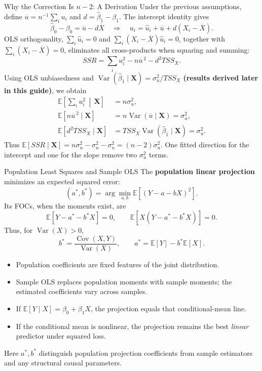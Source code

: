 \documentclass[10pt,aspectratio=169]{beamer}
\newcommand{\E}{\mathbb{E}}
\newcommand{\Var}{\operatorname{Var}}
\newcommand{\Cov}{\operatorname{Cov}}
\begin{document}
\begin{frame}{Why the Correction Is $n-2$: A Derivation}
\small
Under the previous assumptions, define $\overline u=n^{-1}\sum_i u_i$ and
$d=\widehat\beta_1-\beta_1$. The intercept identity gives
\[
\widehat\beta_0-\beta_0=\overline u-d\overline X
\quad\Longrightarrow\quad
u_i=\widehat u_i+\overline u+d(X_i-\overline X).
\]
OLS orthogonality, $\sum_i\widehat u_i=0$ and
$\sum_i(X_i-\overline X)\widehat u_i=0$, together with
$\sum_i(X_i-\overline X)=0$, eliminates all cross-products when squaring and summing:
\[
SSR=\sum_i u_i^2-n\overline u^{\,2}-d^2TSS_X.
\]
Using OLS unbiasedness and $\Var(\widehat\beta_1\mid\mathbf X)=\sigma_u^2/TSS_X$
\textbf{(results derived later in this guide)}, we obtain
\begin{align*}
\E\!\left[\sum_i u_i^2\,\middle|\,\mathbf X\right]&=n\sigma_u^2,\\
\E[n\overline u^{\,2}\mid\mathbf X]&=n\Var(\overline u\mid\mathbf X)=\sigma_u^2,\\
\E[d^2TSS_X\mid\mathbf X]&=TSS_X\Var(\widehat\beta_1\mid\mathbf X)=\sigma_u^2.
\end{align*}
Thus $\E[SSR\mid\mathbf X]=n\sigma_u^2-\sigma_u^2-\sigma_u^2=(n-2)\sigma_u^2$.
One fitted direction for the intercept and one for the slope remove two $\sigma_u^2$ terms.
\end{frame}

\begin{frame}{Population Least Squares and Sample OLS}
\small
The \textbf{population linear projection} minimizes an expected squared error:
\[
(a^*,b^*)=\arg\min_{a,b}\E[(Y-a-bX)^2].
\]
Its FOCs, when the moments exist, are
\[
\E[Y-a^*-b^*X]=0,\qquad
\E[X(Y-a^*-b^*X)]=0.
\]
Thus, for $\Var(X)>0$,
\[
b^*=\frac{\Cov(X,Y)}{\Var(X)},\qquad
a^*=\E[Y]-b^*\E[X].
\]
\begin{itemize}
\item Population coefficients are fixed features of the joint distribution.
\item Sample OLS replaces population moments with sample moments; the estimated coefficients vary across samples.
\item If $\E[Y\mid X]=\beta_0+\beta_1X$, the projection equals that conditional-mean line.
\item If the conditional mean is nonlinear, the projection remains the best \emph{linear} predictor under squared loss.
\end{itemize}
Here $a^*,b^*$ distinguish population projection coefficients from sample estimators and any structural causal parameters.
\end{frame}
\end{document}
